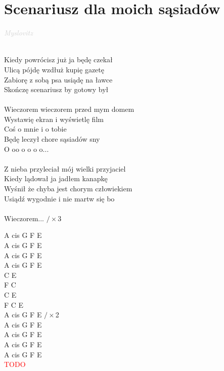 \documentclass[a5paper, 10pt]{book}
\begin{document}
\newpage
\section{Scenariusz dla moich sąsiadów}\textcolor{lightgray}{\textit{Myslovitz}}\\~\\
\begin{minipage}[t]{0.8\textwidth}
Kiedy powrócisz już ja będę czekał\\
Ulicą pójdę wzdłuż kupię gazetę\\
Zabiorę z sobą psa usiądę na ławce\\
Skończę scenariusz by gotowy był\\
\\
\hspace*{5mm}Wieczorem wieczorem przed mym domem\\
\hspace*{5mm}Wystawię ekran i wyświetlę film\\
\hspace*{5mm}Coś o mnie i o tobie\\
\hspace*{5mm}Będę leczył chore sąsiadów sny\\

\hspace*{8mm}O oo o o o o...\\
\\
Z nieba przyleciał mój wielki przyjaciel\\
Kiedy lądował ja jadłem kanapkę\\
Wyśnił że chyba jest chorym człowiekiem\\
Usiądź wygodnie i nie martw się bo\\
\\
\hspace*{5mm}Wieczorem... \hspace{20mm} $/ \times$3\\
\end{minipage}
\begin{minipage}[t]{0.2\textwidth}
A cis G F E\\
A cis G F E\\
A cis G F E\\
A cis G F E\\

C E\\
F C\\
C E\\
F C E\\

A cis G F E $/ \times$2\\

A cis G F E\\
A cis G F E\\
A cis G F E\\
A cis G F E\\

\textcolor{red}{TODO}\\
\end{minipage}
\end{document}

